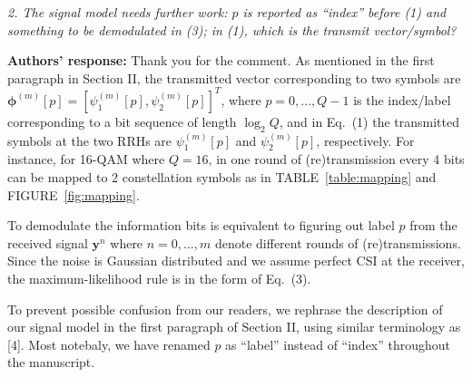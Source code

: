 \documentclass[onecolumn, 11pt, draftclsnofoot]{IEEEtran}
\begin{document}
\vspace{0.5cm}

\noindent
\emph{2. The signal model needs further work: $p$ is reported as “index” before
(1) and something to be demodulated in (3); in (1), which is the transmit
vector/symbol? }

\noindent \textbf{Authors' response:}
Thank you for the comment. As mentioned in the first paragraph in Section
II, the transmitted vector corresponding to two symbols are
$\bm{\phi}^(m)[p] = [\psi_1^{(m)}[p], \psi_2^{(m)}[p]]^T$, where
$p=0,\ldots,Q-1$ is the index/label corresponding to a bit sequence of length
$\log_2Q$, and in Eq.~(1) the transmitted symbols at the two RRHs are
$\psi_1^{(m)}[p]$ and $\psi_2^{(m)}[p]$, respectively. For instance, for 16-QAM where $Q=16$, in
one round of (re)transmission every 4 bits can be mapped to 2 constellation
symbols as in TABLE~\ref{table:mapping} and FIGURE~\ref{fig:mapping}.

To demodulate the information bits is equivalent to figuring out label $p$ from
the received signal $\mathbf{y}^{n}$ where $n=0,\ldots,m$ denote different
rounds of (re)transmissions. Since the noise is Gaussian distributed and we
assume perfect CSI at the receiver, the maximum-likelihood rule is in the form
of Eq.~(3).

To prevent possible confusion from our readers, we rephrase the description of
our signal model in the first paragraph of Section II, using similar
terminology as [4]. Most notebaly, we have renamed $p$ as ``label'' instead of
``index'' throughout the manuscript.
\end{document}
